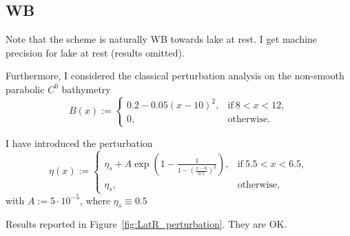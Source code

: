 \documentclass[english]{article}
\theoremstyle{thmstyleone}
\theoremstyle{thmstyletwo}
\theoremstyle{thmstylethree}
\begin{document}
\subsection{WB}
Note that the scheme is naturally WB towards lake at rest.
I get machine precision for lake at rest (results omitted).

Furthermore, I considered the classical perturbation analysis on the non-smooth parabolic $C^0$ bathymetry
\begin{equation}
	B(x):=\begin{cases}
		0.2-0.05(x-10)^2, &\text{if}~8<x<12,\\
		0, & \text{otherwise}.
	\end{cases}
	\label{eq:c0_bathymetry}
\end{equation}

I have introduced the perturbation
\begin{equation}
	\eta(x):=\begin{cases}
		\eta_{s}+A\exp{\left(1-\frac{1}{1-\left(\frac{x-6}{0.5}\right)^2}\right)}, &\text{if}~5.5<x<6.5,\\
		\eta_{s}, & \text{otherwise},
	\end{cases}
	\label{eq:perturbation_lake_at_rest}
\end{equation}
with $A:=5\cdot 10^{-5}$, where $\eta_{s}\equiv 0.5$

Results reported in Figure~\ref{fig:LatR_perturbation}. They are OK.
\end{document}
